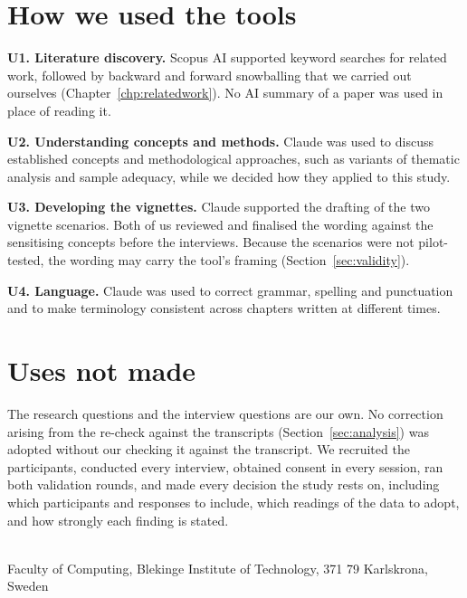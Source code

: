 \documentclass[a4paper,twoside]{bth}
\newcommand{\faculty}{Computing}
\begin{document}
\section{How we used the tools}

\textbf{U1. Literature discovery.} Scopus AI supported keyword searches for related work, followed by backward and forward snowballing that we carried out ourselves (Chapter~\ref{chp:relatedwork}). No AI summary of a paper was used in place of reading it.

\textbf{U2. Understanding concepts and methods.} Claude was used to discuss established concepts and methodological approaches, such as variants of thematic analysis and sample adequacy, while we decided how they applied to this study.

\textbf{U3. Developing the vignettes.} Claude supported the drafting of the two vignette scenarios. Both of us reviewed and finalised the wording against the sensitising concepts before the interviews. Because the scenarios were not pilot-tested, the wording may carry the tool's framing (Section~\ref{sec:validity}).

\textbf{U4. Language.} Claude was used to correct grammar, spelling and punctuation and to make terminology consistent across chapters written at different times.

\section{Uses not made}

The research questions and the interview questions are our own. No correction arising from the re-check against the transcripts (Section~\ref{sec:analysis}) was adopted without our checking it against the transcript. We recruited the participants, conducted every interview, obtained consent in every session, ran both validation rounds, and made every decision the study rests on, including which participants and responses to include, which readings of the data to adopt, and how strongly each finding is stated.

\clearpage
{\pagestyle{empty}
\changepage{3cm}{1cm}{-0.5cm}{-0.5cm}{}{-1.5cm}{}{}{}
\vspace*{\fill}
\center
{\bthcsnotextlogo{3cm}}
\\
\noindent\makebox[\linewidth]{\rule{\textwidth}{1pt}}
Faculty of \faculty, Blekinge Institute of Technology, 371 79 Karlskrona, Sweden
}
\end{document}
